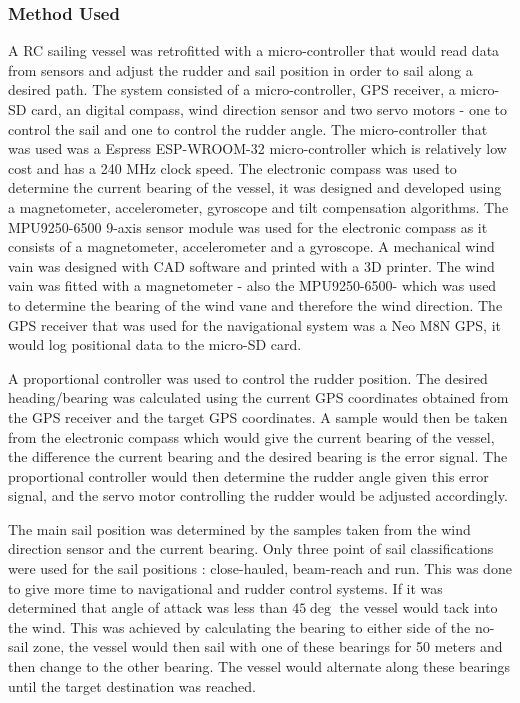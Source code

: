 \subsubsection{Method Used}
A RC sailing vessel was retrofitted with a micro-controller that would read data from sensors and adjust the rudder and sail position in order to sail along a 
desired path. The system consisted of a micro-controller, GPS receiver, a micro-SD card, an digital compass, wind direction sensor and two servo motors - one to control the 
sail and one to control the rudder angle. The micro-controller that was used was a Espress ESP-WROOM-32 micro-controller which is relatively low cost and has 
a 240 MHz clock speed. The electronic compass was used to determine the current bearing of the vessel, it was designed and developed using a magnetometer, 
accelerometer, gyroscope and tilt compensation algorithms. The MPU9250-6500 9-axis sensor module was used for the electronic compass as it consists of a magnetometer, accelerometer and a 
gyroscope. A mechanical wind vain was designed with CAD software and printed with a 3D printer. The wind vain
was fitted with a magnetometer - also the MPU9250-6500- which was used to determine the bearing of the wind vane and therefore the wind direction. The GPS receiver that was used for the navigational
system was a Neo M8N GPS, it would log positional data to the micro-SD card. 

A proportional controller was used to control the rudder position. The desired heading/bearing was calculated using the current GPS coordinates obtained from the 
GPS receiver and the target GPS coordinates. A sample would then be taken from the electronic compass which would give the current bearing of the vessel, the difference 
the current bearing and the desired bearing is the error signal. The proportional controller would then determine the rudder angle given this error signal, and the servo 
motor controlling the rudder would be adjusted accordingly. 

The main sail position was determined by the samples taken from the wind direction sensor and the current bearing. Only three point of sail classifications were used for the sail positions 
: close-hauled, beam-reach and run. This was done to give more time to navigational and rudder control systems. If it was determined that angle of attack was less than $45\deg$
the vessel would tack into the wind. This was achieved by calculating the bearing to either side of the no-sail zone, the vessel would then sail with one of these bearings for 50 meters 
and then change to the other bearing. The vessel would alternate along these bearings until the target destination was reached.

